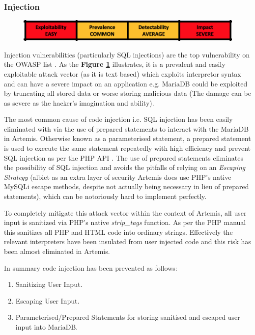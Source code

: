     \subsubsection{Injection}
    
    \begin{figure}[H]
    	\includegraphics[scale=0.80,center]{figures/injection}
    	\label{injection}
    \end{figure}
    
    
    Injection vulnerabilities (particularly SQL injections) are the top vulnerability on the OWASP list \cite{OWASP2017}. As the \textbf{Figure \ref{injection}} illustrates, it is a prevalent and easily exploitable attack vector (as it is text based) which exploits interpretor syntax and can have a severe impact on an application e.g. MariaDB could be exploited by truncating all stored data or worse storing malicious data (The damage can be as severe as the hacker's imagination and ability).
    

    The most common cause of code injection i.e. SQL injection has been easily eliminated with via the use of prepared statements to interact with the MariaDB in Artemis. Otherwise known as a parameterised statement, a prepared statement is used to execute the same statement repeatedly with high efficiency and prevent SQL injection as per the PHP API \cite{PHP}. The use of prepared statements eliminates the possibility of SQL injection and avoids the pitfalls of relying on an \textit{Escaping Strategy} (albiet as an extra layer of security Artemis does use PHP's native MySQLi escape methods, despite not actually being necessary in lieu of prepared statements), which can be notoriously hard to implement perfectly.
    
    To completely mitigate this attack vector within the context of Artemis, all user input is  sanitized via PHP's native \textit{strip\_tags} function. As per the PHP manual this sanitizes all PHP and HTML code into ordinary strings. Effectively the relevant interpreters have been insulated from user injected code and this risk has been almost eliminated in Artemis.
    

    
    In summary code injection has been prevented as follows:
    \begin{enumerate}
        \item Sanitizing User Input.
        \item Escaping User Input.
        \item Parameterised/Prepared Statements for storing sanitised and escaped user input into MariaDB.
    \end{enumerate}
    
